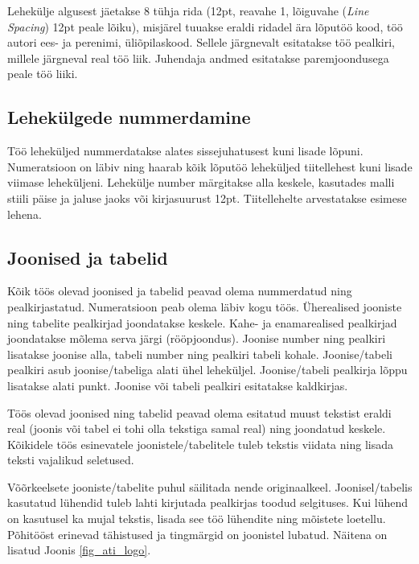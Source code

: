 \documentclass[12pt]{article} %
\begin{document}
Lehekülje algusest jäetakse 8 tühja rida (12pt, reavahe 1, lõiguvahe (\textit{Line Spacing}) 12pt peale lõiku), misjärel tuuakse eraldi ridadel ära lõputöö kood, töö autori ees- ja perenimi, üliõpilaskood. Sellele järgnevalt esitatakse töö pealkiri, millele järgneval real töö liik. Juhendaja andmed esitatakse paremjoondusega peale töö liiki.

\subsection{Lehekülgede nummerdamine}
\label{Lehekülgede nummerdamine} %
Töö leheküljed nummerdatakse alates sissejuhatusest kuni lisade lõpuni. Numeratsioon on läbiv ning haarab kõik lõputöö leheküljed tiitellehest kuni lisade viimase leheküljeni. Lehekülje number märgitakse alla keskele, kasutades malli stiili päise ja jaluse jaoks või kirjasuurust 12pt. Tiitellehelte arvestatakse esimese lehena.

\subsection{Joonised ja tabelid}
\label{Joonised ja tabelid} %

Kõik töös olevad joonised ja tabelid peavad olema nummerdatud ning pealkirjastatud. Numeratsioon peab olema läbiv kogu töös. Üherealised jooniste ning tabelite pealkirjad joondatakse keskele. Kahe- ja enamarealised pealkirjad joondatakse mõlema serva järgi (rööpjoondus). Joonise number ning pealkiri lisatakse joonise alla, tabeli number ning pealkiri tabeli kohale. Joonise/tabeli pealkiri asub joonise/tabeliga alati ühel leheküljel. Joonise/tabeli pealkirja lõppu lisatakse alati punkt. Joonise või tabeli pealkiri esitatakse kaldkirjas.

Töös olevad joonised ning tabelid peavad olema esitatud muust tekstist eraldi real (joonis või tabel ei tohi olla tekstiga samal real) ning joondatud keskele. Kõikidele töös esinevatele joonistele/tabelitele tuleb tekstis viidata ning lisada teksti vajalikud seletused.

Võõrkeelsete jooniste/tabelite puhul säilitada nende originaalkeel. Joonisel/tabelis kasutatud lühendid tuleb lahti kirjutada pealkirjas toodud selgituses. Kui lühend on kasutusel ka mujal tekstis, lisada see töö lühendite ning mõistete loetellu. Põhitööst erinevad tähistused ja tingmärgid on joonistel lubatud. Näitena on lisatud Joonis \ref{fig_ati_logo}.
\end{document}
